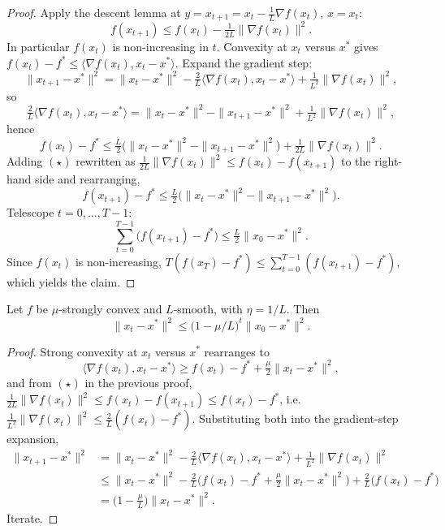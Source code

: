 \begin{proof}
Apply the descent lemma at $y = x_{t+1} = x_t - \tfrac{1}{L}\nabla f(x_t)$, $x = x_t$:
\begin{equation}
f(x_{t+1}) \leq f(x_t) - \tfrac{1}{2L}\|\nabla f(x_t)\|^2. \tag{$\star$}
\end{equation}
In particular $f(x_t)$ is non-increasing in $t$. Convexity at $x_t$ versus $x^*$ gives $f(x_t) - f^* \leq \langle \nabla f(x_t), x_t - x^*\rangle$. Expand the gradient step:
\[
\|x_{t+1} - x^*\|^2 = \|x_t - x^*\|^2 - \tfrac{2}{L}\langle \nabla f(x_t), x_t - x^*\rangle + \tfrac{1}{L^2}\|\nabla f(x_t)\|^2,
\]
so
\[
\tfrac{2}{L}\langle \nabla f(x_t), x_t - x^*\rangle = \|x_t - x^*\|^2 - \|x_{t+1} - x^*\|^2 + \tfrac{1}{L^2}\|\nabla f(x_t)\|^2,
\]
hence
\[
f(x_t) - f^* \leq \tfrac{L}{2}\bigl(\|x_t - x^*\|^2 - \|x_{t+1} - x^*\|^2\bigr) + \tfrac{1}{2L}\|\nabla f(x_t)\|^2.
\]
Adding $(\star)$ rewritten as $\tfrac{1}{2L}\|\nabla f(x_t)\|^2 \leq f(x_t) - f(x_{t+1})$ to the right-hand side and rearranging,
\[
f(x_{t+1}) - f^* \leq \tfrac{L}{2}\bigl(\|x_t - x^*\|^2 - \|x_{t+1} - x^*\|^2\bigr).
\]
Telescope $t = 0, \ldots, T-1$:
\[
\sum_{t=0}^{T-1} \bigl(f(x_{t+1}) - f^*\bigr) \leq \tfrac{L}{2}\|x_0 - x^*\|^2.
\]
Since $f(x_t)$ is non-increasing, $T (f(x_T) - f^*) \leq \sum_{t=0}^{T-1}(f(x_{t+1}) - f^*)$, which yields the claim.
\end{proof}

\begin{theorem}
Let $f$ be $\mu$-strongly convex and $L$-smooth, with $\eta = 1/L$. Then
\[
\|x_t - x^*\|^2 \leq \bigl(1 - \mu/L\bigr)^t \|x_0 - x^*\|^2.
\]
\end{theorem}

\begin{proof}
Strong convexity at $x_t$ versus $x^*$ rearranges to
\[
\langle \nabla f(x_t), x_t - x^*\rangle \geq f(x_t) - f^* + \tfrac{\mu}{2}\|x_t - x^*\|^2,
\]
and from $(\star)$ in the previous proof, $\tfrac{1}{2L}\|\nabla f(x_t)\|^2 \leq f(x_t) - f(x_{t+1}) \leq f(x_t) - f^*$, i.e. $\tfrac{1}{L^2}\|\nabla f(x_t)\|^2 \leq \tfrac{2}{L}(f(x_t) - f^*)$. Substituting both into the gradient-step expansion,
\begin{align*}
\|x_{t+1} - x^*\|^2 &= \|x_t - x^*\|^2 - \tfrac{2}{L}\langle \nabla f(x_t), x_t - x^*\rangle + \tfrac{1}{L^2}\|\nabla f(x_t)\|^2 \\
&\leq \|x_t - x^*\|^2 - \tfrac{2}{L}\bigl(f(x_t) - f^* + \tfrac{\mu}{2}\|x_t - x^*\|^2\bigr) + \tfrac{2}{L}\bigl(f(x_t) - f^*\bigr) \\
&= \bigl(1 - \tfrac{\mu}{L}\bigr)\|x_t - x^*\|^2.
\end{align*}
Iterate.
\end{proof}

